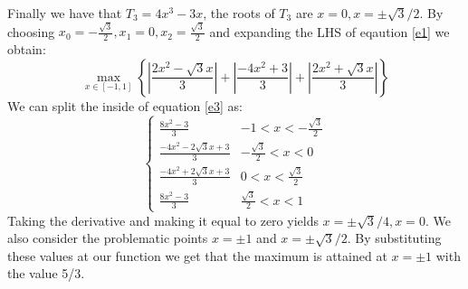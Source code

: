 \begin{solution}
Finally we have that $T_3 = 4x^3-3x$, the roots of $T_3$ are $x=0, x=\pm \sqrt{3}/2$. By choosing $x_0 = -\frac{\sqrt{3}}{2}, x_1 = 0, x_2 = \frac{\sqrt{3}}{2}$ and expanding the LHS of eqaution \ref{e1} we obtain:
\begin{equation}
\max_{x \in [-1,1]} \left \{ \left | \frac{2x^2-\sqrt{3}x}{3} \right | + \left | \frac{-4x^2+3}{3} \right | + \left | \frac{2x^2+\sqrt{3}x}{3} \right | \right \}
\label{e3}
\end{equation}
We can split the inside of equation \ref{e3} as:
\[ \begin{cases} 
      \frac{8x^2-3}{3}  &-1< x< -\frac{\sqrt{3}}{2} \\
      \frac{-4x^2-2\sqrt{3}x+3}{3}  &-\frac{\sqrt{3}}{2}< x< 0 \\
      \frac{-4x^2+2\sqrt{3}x+3}{3} & 0 < x < \frac{\sqrt{3}}{2} \\
      \frac{8x^2-3}{3} & \frac{\sqrt{3}}{2}<x<1 
   \end{cases}
\]
Taking the derivative and making it equal to zero yields $x = \pm \sqrt{3}/4, x = 0$. We also consider the problematic points $x = \pm 1$ and $x = \pm \sqrt{3}/2$. By substituting these values at our function we get that the maximum is attained at $x=\pm 1$ with the value 5/3.
\end{solution}

